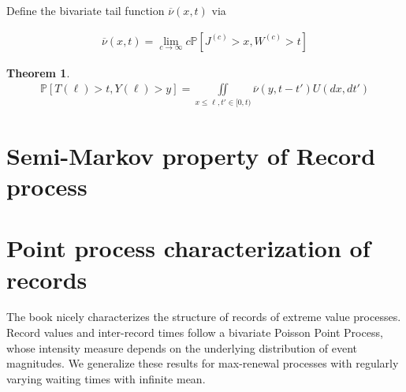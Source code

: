 \documentclass[12pt]{article}
\newtheorem{theorem}[equation]{Theorem}
\newcommand{\pr}{\mathbb {P}}
\newcommand{\1}{\mathbf 1}
\begin{document}
Define the bivariate tail function $\overline \nu(x,t)$ via 

\begin{align}
\overline \nu(x,t) = \lim_{c \to \infty} c \pr [J^{(c)} > x, W^{(c)} > t]
\end{align}


\begin{theorem}
\begin{align}
\pr [T(\ell) > t, Y(\ell) > y]
= \iint\limits_{x \le \ell, t' \in [0,t)} \overline \nu(y, t - t') U(dx, dt')
\end{align}
\end{theorem}


\section{Semi-Markov property of Record process}

\section{Point process characterization of records}
\label{sec:records}


The book \cite[Chapter 4]{resnick2013extreme} nicely characterizes the structure of records of extreme value processes. Record values and inter-record times follow a bivariate Poisson Point Process, whose intensity measure depends on the underlying distribution of event magnitudes. We generalize these results for max-renewal processes with regularly varying waiting times with infinite mean. 
\end{document}
